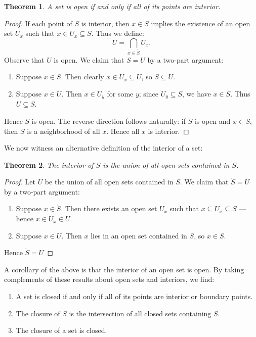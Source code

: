 \documentclass[11pt]{article}
\newtheorem{theorem}{Theorem}
\begin{document}
\begin{adjustwidth}{0.5cm}{}
  \begin{theorem}
    A set is open if and only if all of its points are interior.
  \end{theorem}
  \begin{proof}
    If each point of $S$ is interior, then $x \in S$ implies the existence of an open set $U_{x}$ such that $x \in U_{x} \subseteq S$. Thus we define:
    \[
      U = \bigcap\limits_{x \in \mathring{S}} U_{x}.
    \]
    Observe that $U$ is open. We claim that $S = U$ by a two-part argument:
    \begin{enumerate}
      \item Suppose $x \in S$. Then clearly $x \in U_{x} \subseteq U$, so $S \subseteq U$.
      \item Suppose $x \in U$. Then $x \in U_{y}$ for some $y$; since $U_{y} \subseteq S$, we have $x \in S$. Thus $U \subseteq S$.
    \end{enumerate}
    Hence $S$ is open. The reverse direction follows naturally: if $S$ is open and $x \in S$, then $S$ is a neighborhood of all $x$. Hence all $x$ is interior.
  \end{proof}
\end{adjustwidth}

We now witness an alternative definition of the interior of a set:

\begin{adjustwidth}{0.5cm}{}
  \begin{theorem}
    The interior of $S$ is the union of all open sets contained in $S$.
  \end{theorem}
  \begin{proof}
    Let $U$ be the union of all open sets contained in $S$. We claim that $\mathring{S} = U$ by a two-part argument:
    \begin{enumerate}
      \item Suppose $x \in \mathring{S}$. Then there exists an open set $U_{x}$ such that $x \subseteq U_{x} \subseteq S$ --- hence $x \in U_{x} \in U$.
      \item Suppose $x \in U$. Then $x$ lies in an open set contained in $S$, so $x \in S$.
    \end{enumerate}
    Hence $\mathring{S} = U$
  \end{proof}
\end{adjustwidth}

A corollary of the above is that the interior of an open set is open. By taking complements of these results about open sets and interiors, we find:
\begin{enumerate}
  \item A set is closed if and only if all of its points are interior or boundary points.
  \item The closure of $S$ is the intersection of all closed sets containing $S$.
  \item The closure of a set is closed.
\end{enumerate}
\end{document}
